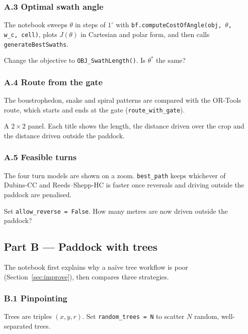 \documentclass[11pt,a4paper]{article}
\newcommand{\code}[1]{\texttt{\small #1}}
\begin{document}
\subsubsection*{A.3 Optimal swath angle} The notebook sweeps $\theta$ in steps of $1^\circ$ with
\code{bf.computeCostOfAngle(obj, $\theta$, w\_c, cell)}, plots $J(\theta)$ in Cartesian and polar form, and then calls \code{generateBestSwaths}.
\begin{trybox}Change the objective to \code{OBJ\_SwathLength()}. Is $\theta^*$ the same?\end{trybox}

\subsubsection*{A.4 Route from the gate} The boustrophedon, snake and spiral patterns are compared with the OR-Tools route, which
starts and ends at the gate (\code{route\_with\_gate}).
\begin{seebox}A $2\times2$ panel. Each title shows the length, the distance driven over the crop and the distance driven outside the paddock.\end{seebox}

\subsubsection*{A.5 Feasible turns} The four turn models are shown on a zoom. \code{best\_path} keeps whichever of Dubins-CC and
Reeds--Shepp-HC is faster once reversals and driving outside the paddock are penalised.
\begin{trybox}Set \code{allow\_reverse = False}. How many metres are now driven outside the paddock?\end{trybox}

\subsection*{Part B --- Paddock with trees}
The notebook first explains why a naïve tree workflow is poor (Section~\ref{sec:improve}), then compares three strategies.

\subsubsection*{B.1 Pinpointing} Trees are triples $(x,y,r)$. Set \code{random\_trees = N} to scatter $N$ random, well-separated trees.
\end{document}

